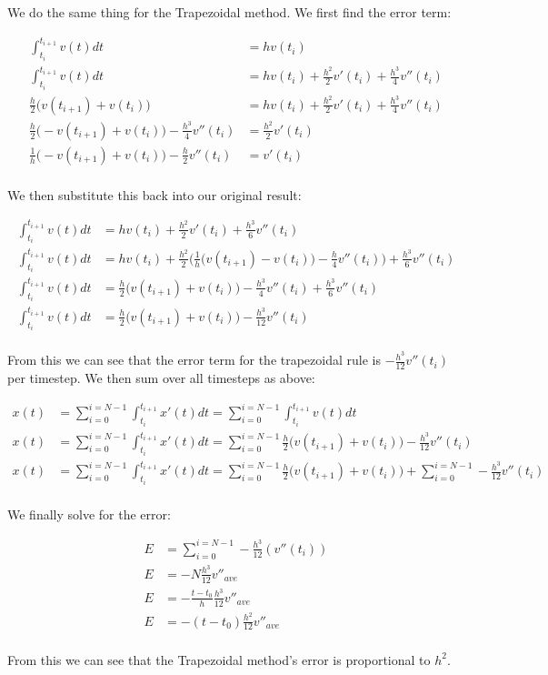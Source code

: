 \documentclass[10pt]{article} %
\begin{document}
We do the same thing for the Trapezoidal method. We first find the error term:

\begin{align}
  \int_{t_i}^{t_{i+1}} v(t)dt &= hv(t_i)\\
  \int_{t_i}^{t_{i+1}} v(t)dt &= hv(t_i) + \frac{h^2}{2}v'(t_i) + \frac{h^3}{4}v''(t_i)\\
  \frac{h}{2}\Big(v(t_{i+1}) + v(t_i)\Big) &= hv(t_i) + \frac{h^2}{2}v'(t_i) + \frac{h^3}{4}v''(t_i)\\
  \frac{h}{2}\Big(-v(t_{i+1}) + v(t_i)\Big) - \frac{h^3}{4}v''(t_i) &= \frac{h^2}{2}v'(t_i)\\
  \frac{1}{h}\Big(-v(t_{i+1}) + v(t_i)\Big) - \frac{h}{2}v''(t_i) &= v'(t_i)\\
\end{align}

We then substitute this back into our original result:

\begin{align}
  \int_{t_i}^{t_{i+1}} v(t)dt &= hv(t_i) + \frac{h^2}{2}v'(t_i) + \frac{h^3}{6}v''(t_i) \\
  \int_{t_i}^{t_{i+1}} v(t)dt &= hv(t_i) + \frac{h^2}{2}\Big(\frac{1}{h}\Big(v(t_{i+1}) - v(t_i)\Big) - \frac{h}{4}v''(t_i) \Big) + \frac{h^3}{6}v''(t_i) \\
  \int_{t_i}^{t_{i+1}} v(t)dt &= \frac{h}{2}\big(v(t_{i+1}) + v(t_i)\big) - \frac{h^3}{4}v''(t_i) + \frac{h^3}{6}v''(t_i) \\
  \int_{t_i}^{t_{i+1}} v(t)dt &= \frac{h}{2}\big(v(t_{i+1}) + v(t_i)\big) - \frac{h^3}{12}v''(t_i)\\    
\end{align}

From this we can see that the error term for the trapezoidal rule is $-\frac{h^3}{12}v''(t_i)$ per timestep. We then sum over all timesteps as above:

\begin{align}
    x(t) &= \sum_{i=0}^{i=N-1} \int_{t_i}^{t_{i+1}} x'(t)dt = \sum_{i=0}^{i=N-1} \int_{t_i}^{t_{i+1}} v(t)dt\\
  x(t) &= \sum_{i=0}^{i=N-1} \int_{t_i}^{t_{i+1}} x'(t)dt = \sum_{i=0}^{i=N-1} \frac{h}{2}\big(v(t_{i+1}) + v(t_i)\big) - \frac{h^3}{12}v''(t_i)\\
  x(t) &= \sum_{i=0}^{i=N-1} \int_{t_i}^{t_{i+1}} x'(t)dt = \sum_{i=0}^{i=N-1} \frac{h}{2}\big(v(t_{i+1}) + v(t_i)\big) + \sum_{i=0}^{i=N-1} -\frac{h^3}{12}v''(t_i)\\
\end{align}

We finally solve for the error:

\begin{align}
  E &= \sum_{i=0}^{i=N-1} -\frac{h^3}{12}(v''(t_i))\\
  E &= -N\frac{h^3}{12}v''_{ave}\\
  E &= -\frac{t - t_0}{h} \frac{h^3}{12}v''_{ave}\\
  E &= -(t - t_0)\frac{h^2}{12}v''_{ave}\\
\end{align}

From this we can see that the Trapezoidal method's error is proportional to $h^2$.
\end{document}
